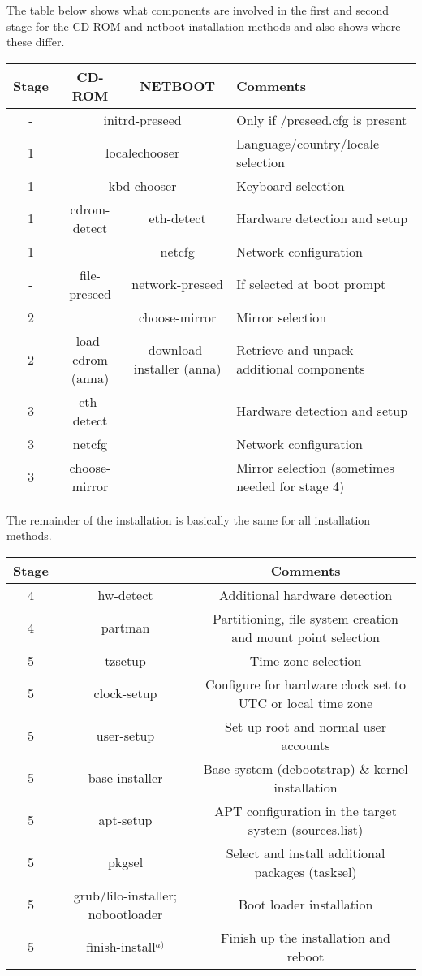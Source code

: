 \documentclass[a4paper,10pt]{article}
\begin{document}
The table below shows what components are involved in the first and second stage for the CD-ROM and netboot installation methods and also shows where these differ. 

\begin{tabular}{|c|c|c|l|}
\hline
\textbf{Stage} & \textbf{CD-ROM} & \textbf{NETBOOT} & \textbf{Comments} \\
\hline
-  & \multicolumn{2}{c|}{initrd-preseed} & Only if /preseed.cfg is present \\
\hline
1  & \multicolumn{2}{c|}{localechooser} & Language/country/locale selection \\
\hline
1 & \multicolumn{2}{c|}{kbd-chooser} & Keyboard selection \\
\hline
1 & cdrom-detect & eth-detect & Hardware detection and setup \\
\hline
1 & & netcfg & Network configuration \\
\hline
- & file-preseed & network-preseed & If selected at boot prompt \\
\hline
2 & & choose-mirror & Mirror selection \\
\hline
2 & load-cdrom (anna) & download-installer (anna) & Retrieve and unpack additional components \\
\hline
3 & eth-detect & & Hardware detection and setup \\
\hline
3 & netcfg & & Network configuration \\
\hline
3 & choose-mirror & & Mirror selection (sometimes needed for stage 4) \\
\hline
\end{tabular}

The remainder of the installation is basically the same for all installation methods. 


\begin{tabular}{|c|c|c|}
\hline
\textbf{Stage} & & \textbf{Comments} \\
\hline
4 & hw-detect & Additional hardware detection \\
\hline
4 & partman & Partitioning, file system creation and mount point selection \\
\hline
5 & tzsetup & Time zone selection \\
\hline
5 & clock-setup & Configure for hardware clock set to UTC or local time zone \\
\hline
5 & user-setup & Set up root and normal user accounts \\
\hline
5 & base-installer & Base system (debootstrap) \& kernel installation \\
\hline
5 & apt-setup & APT configuration in the target system (sources.list) \\
\hline
5 & pkgsel & Select and install additional packages (tasksel) \\
\hline
5 & grub/lilo-installer; nobootloader & Boot loader installation \\
\hline
5 & finish-install$^{a)}$ & Finish up the installation and reboot \\
\hline
\end{tabular} 
\end{document}
